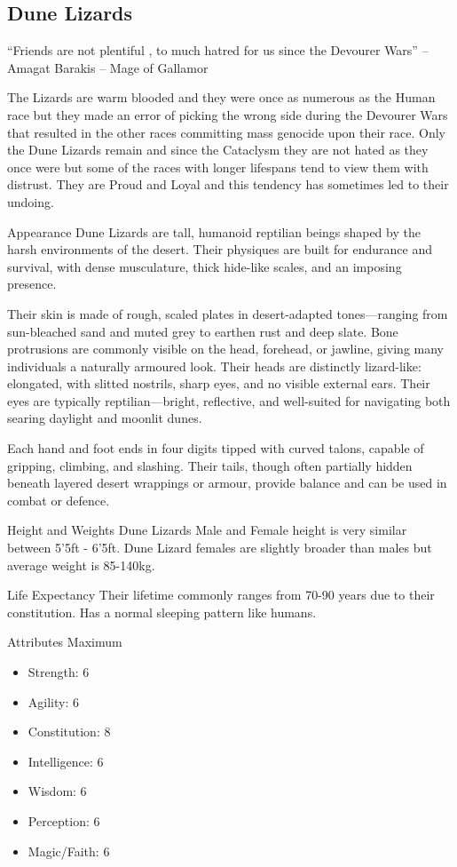 \begin{multicols}{2}
\subsection{Dune Lizards}

“Friends are not plentiful , to much hatred for us since the Devourer Wars” – Amagat Barakis – Mage of Gallamor

The Lizards are warm blooded and they were once as numerous as the Human race but they made an error of picking the wrong side during the Devourer Wars that
resulted in the other races committing mass genocide upon
their race. Only the Dune Lizards remain and since the
Cataclysm they are not hated as they once were but some
of the races with longer lifespans tend to view them with
distrust. They are Proud and Loyal and this tendency has
sometimes led to their undoing.

Appearance 
Dune Lizards are tall, humanoid reptilian beings shaped by the harsh environments of the desert. Their physiques are built for endurance and survival, with dense musculature, thick hide-like scales, and an imposing presence.

Their skin is made of rough, scaled plates in desert-adapted tones—ranging from sun-bleached sand and muted grey to earthen rust and deep slate. Bone protrusions are commonly visible on the head, forehead, or jawline, giving many individuals a naturally armoured look. Their heads are distinctly lizard-like: elongated, with slitted nostrils, sharp eyes, and no visible external ears. Their eyes are typically reptilian—bright, reflective, and well-suited for navigating both searing daylight and moonlit dunes.

Each hand and foot ends in four digits tipped with curved talons, capable of gripping, climbing, and slashing. Their tails, though often partially hidden beneath layered desert wrappings or armour, provide balance and can be used in combat or defence.

Height and Weights
Dune Lizards Male and Female height is very similar between 5’5ft - 6’5ft. Dune Lizard females are slightly broader than males but average weight is 85-140kg.

Life Expectancy
Their lifetime commonly ranges from 70-90 years due to their constitution. Has a normal sleeping pattern like humans.

Attributes Maximum
\begin{itemize}
\item Strength: 6
\item Agility: 6
\item Constitution: 8
\item Intelligence: 6
\item Wisdom: 6
\item Perception: 6
\item Magic/Faith: 6
\end{itemize}



\end{multicols}
